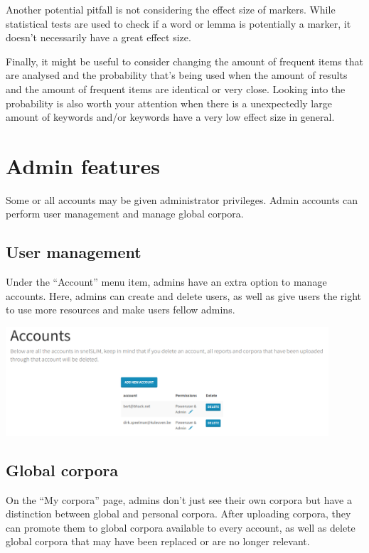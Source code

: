 \documentclass[11pt,a4paper]{article}
\begin{document}
Another potential pitfall is not considering the effect size of markers. While statistical tests are used to check if a word or lemma is potentially a marker, it doesn't necessarily have a great effect size.

Finally, it might be useful to consider changing the amount of frequent items that are analysed and the probability that's being used when the amount of results and the amount of frequent items are identical or very close. Looking into the probability is also worth your attention when there is a unexpectedly large amount of keywords and/or keywords have a very low effect size in general.

\section{Admin features}

Some or all accounts may be given administrator privileges. Admin accounts can perform user management and manage global corpora.

\subsection{User management}

Under the ``Account'' menu item, admins have an extra option to manage accounts. Here, admins can create and delete users, as well as give users the right to use more resources and make users fellow admins.

\centerline{\includegraphics[width=0.9\textwidth]{images/users.png}}

\subsection{Global corpora}

On the ``My corpora'' page, admins don't just see their own corpora but have a distinction between global and personal corpora. After uploading corpora, they can promote them to global corpora available to every account, as well as delete global corpora that may have been replaced or are no longer relevant.
\end{document}
